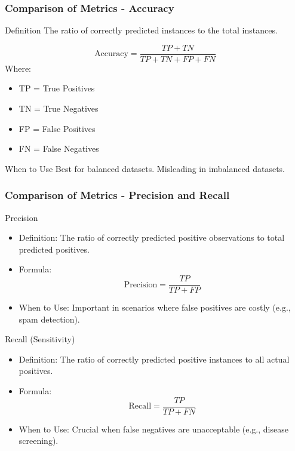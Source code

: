 \documentclass[aspectratio=169]{beamer}
\begin{document}
\begin{frame}[fragile]
    \frametitle{Comparison of Metrics - Accuracy}
    \begin{block}{Definition}
        The ratio of correctly predicted instances to the total instances.
    \end{block}
    
    \begin{equation}
        \text{Accuracy} = \frac{TP + TN}{TP + TN + FP + FN}
    \end{equation}
    Where:
    \begin{itemize}
        \item TP = True Positives
        \item TN = True Negatives
        \item FP = False Positives
        \item FN = False Negatives
    \end{itemize}

    \begin{block}{When to Use}
        Best for balanced datasets. Misleading in imbalanced datasets.
    \end{block}
\end{frame}

\begin{frame}[fragile]
    \frametitle{Comparison of Metrics - Precision and Recall}
    \begin{block}{Precision}
        \begin{itemize}
            \item Definition: The ratio of correctly predicted positive observations to total predicted positives.
            \item Formula:
            \begin{equation}
                \text{Precision} = \frac{TP}{TP + FP}
            \end{equation}
            \item When to Use: Important in scenarios where false positives are costly (e.g., spam detection).
        \end{itemize}
    \end{block}

    \begin{block}{Recall (Sensitivity)}
        \begin{itemize}
            \item Definition: The ratio of correctly predicted positive instances to all actual positives.
            \item Formula:
            \begin{equation}
                \text{Recall} = \frac{TP}{TP + FN}
            \end{equation}
            \item When to Use: Crucial when false negatives are unacceptable (e.g., disease screening).
        \end{itemize}
    \end{block}
\end{frame}
\end{document}
